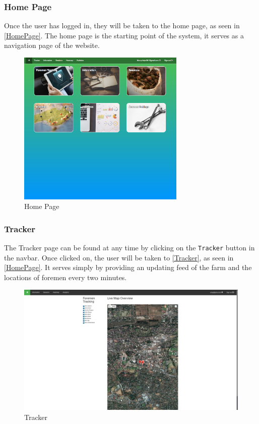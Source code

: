 \documentclass[11pt]{article}
\begin{document}
\subsubsection{Home Page}
\label{webHome}
Once the user has logged in, they will be taken to the home page, as seen in \ref{HomePage}. The home page is the starting point of the system, it serves as a navigation page of the website.

\begin{figure}
 \centering
 \includegraphics[width=8cm, keepaspectratio]{Images/UsingSystem/WebHome.png}
 \caption{Home Page}
 \label{webHome}
\end{figure}

\subsubsection{Tracker}
\label{webTracker}
The Tracker page can be found at any time by clicking on the \texttt{Tracker} button in the navbar. Once clicked on, the user will be taken to \ref{Tracker}, as seen in \ref{HomePage}. It serves simply by providing an updating feed of the farm and the locations of foremen every two minutes.

\begin{figure}
 \centering
 \includegraphics[width=12cm, keepaspectratio]{Images/webHome-Page.png}
 \caption{Tracker}
 \label{webTracker}
\end{figure}
\end{document}
